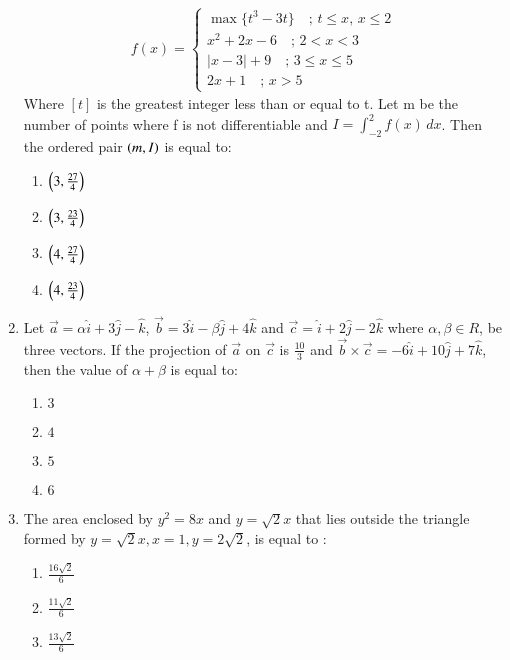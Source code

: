\documentclass[journal,12pt,twocolumn]{IEEEtran}
\theoremstyle{remark}
\begin{document}
\begin{enumerate}
\begin{align*}
f(x) =
\begin{cases}
\max \{ t^3 - 3t \} \quad ; \, t \leq x, \, x \leq 2 \\
x^2 + 2x - 6 \quad ; \, 2 < x < 3 \\
|x - 3| + 9 \quad ; \, 3 \leq x \leq 5 \\
2x + 1 \quad ; \, x > 5
\end{cases}
\end{align*} 
Where $[t]$ is the greatest integer less than or equal to t. Let m be the number of points where f is not differentiable and $I = \int_{-2}^{2} f(x) \, dx$. Then the ordered pair $\left(m,I\right)$ is equal to:
\begin{multicols}{2}
\begin{enumerate}
    \item $\left(3,\frac{27}{4}\right)$
    \item $\left(3,\frac{23}{4}\right)$
    \item $\left(4,\frac{27}{4}\right)$
    \item $\left(4,\frac{23}{4}\right)$
\end{enumerate}
\end{multicols}
\bigskip
\item Let $\vec{a}=\alpha \hat{i}+3\hat{j}-\hat{k}$, $\vec{b}=3\hat{i}-\beta\hat{j}+4\hat{k}$ and $\vec{c}=\hat{i}+2\hat{j}-2\hat{k}$ where $\alpha,\beta \in R$, be three vectors. If the projection of $\vec{a}$ on $\vec{c}$ is $\frac{10}{3}$ and $\vec{b}\times \vec{c}=-6\hat{i}+10\hat{j}+7\hat{k}$, then the value of $\alpha+\beta$ is equal to:
\begin{multicols}{2}
\begin{enumerate}
    \item $3$
    \item $4$
    \item $5$
    \item $6$
\end{enumerate}
\end{multicols}
\bigskip
\item The area enclosed by $y^2=8x$ and $y=\sqrt{2}x$ that lies outside the triangle formed by $y=\sqrt{2}x,x=1,y=2\sqrt{2}$, is equal to :
\begin{multicols}{2}
\begin{enumerate}
    \item $\frac{16\sqrt{2}}{6}$
    \item $\frac{11\sqrt{2}}{6}$
    \item $\frac{13\sqrt{2}}{6}$

\end{enumerate}
\end{multicols}
\end{enumerate}
\end{document}
